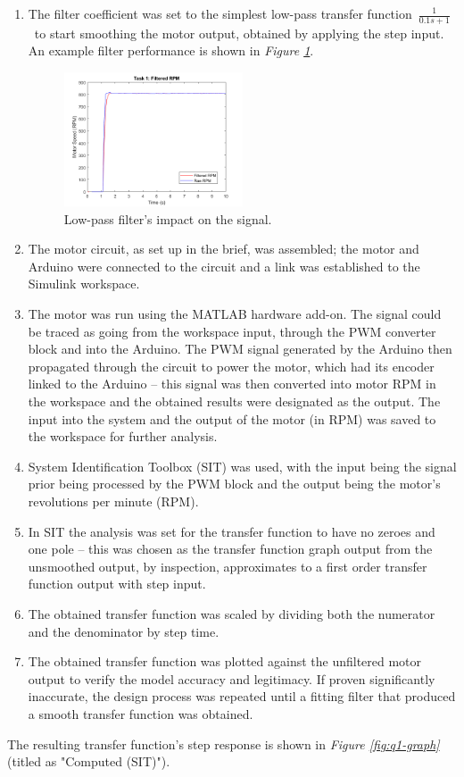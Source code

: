 \documentclass[11pt, onecolumn]{article}
\begin{document}
\begin{enumerate}
    \item The filter coefficient was set to the simplest low-pass transfer function $\frac{1}{0.1s+1}$ to start smoothing the motor output, obtained by applying the step input. An example filter performance is shown in \textit{Figure \ref{fig:q1-filter}}.
          \begin{figure}[h!]
              \centering
              \includegraphics[width=0.5\textwidth]{q1-filter.png}
              \caption{Low-pass filter's impact on the signal.}
              \label{fig:q1-filter}
          \end{figure}
    \item The motor circuit, as set up in the brief, was assembled; the motor and Arduino were connected to the circuit and a link was established to the Simulink workspace.
    \item The motor was run using the MATLAB hardware add-on. The signal could be traced as going from the workspace input, through the PWM converter block and into the Arduino. The PWM signal generated by the Arduino then propagated through the circuit to power the motor, which had its encoder linked to the Arduino – this signal was then converted into motor RPM in the workspace and the obtained results were designated as the output. The input into the system and the output of the motor (in RPM) was saved to the workspace for further analysis.
    \item System Identification Toolbox (SIT) was used, with the input being the signal prior being processed by the PWM block and the output being the motor's revolutions per minute (RPM).
    \item In SIT the analysis was set for the transfer function to have no zeroes and one pole – this was chosen as the transfer function graph output from the unsmoothed output, by inspection, approximates to a first order transfer function output with step input.
    \item The obtained transfer function was scaled by dividing both the numerator and the denominator by step time.
    \item The obtained transfer function was plotted against the unfiltered motor output to verify the model accuracy and legitimacy. If proven significantly inaccurate, the design process was repeated until a fitting filter that produced a smooth transfer function was obtained.
\end{enumerate}
\par The resulting transfer function's step response is shown in \textit{Figure \ref{fig:q1-graph}} (titled as "Computed (SIT)").
\end{document}
